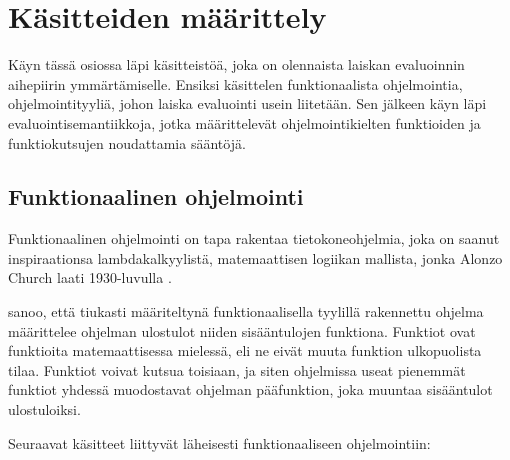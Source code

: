 \section{Käsitteiden määrittely}\label{kasitteisto}

Käyn tässä osiossa läpi käsitteistöä, joka on olennaista laiskan evaluoinnin aihepiirin ymmärtämiselle. Ensiksi käsittelen funktionaalista ohjelmointia, ohjelmointityyliä, johon laiska evaluointi usein liitetään. Sen jälkeen käyn läpi evaluointisemantiikkoja, jotka määrittelevät ohjelmointikielten funktioiden ja funktiokutsujen noudattamia sääntöjä.

\subsection{Funktionaalinen ohjelmointi}
Funktionaalinen ohjelmointi on tapa rakentaa tietokoneohjelmia, joka on saanut inspiraationsa lambdakalkyylistä, matemaattisen logiikan mallista, jonka Alonzo Church laati 1930-luvulla \citep{church1932set}.

\citet{scott2009programming} sanoo, että tiukasti määriteltynä funktionaalisella tyylillä rakennettu ohjelma määrittelee ohjelman ulostulot niiden sisääntulojen funktiona. Funktiot ovat funktioita matemaattisessa mielessä, eli ne eivät muuta funktion ulkopuolista tilaa. Funktiot voivat kutsua toisiaan, ja siten ohjelmissa useat pienemmät funktiot yhdessä muodostavat ohjelman pääfunktion, joka muuntaa sisääntulot ulostuloiksi.

Seuraavat käsitteet liittyvät läheisesti funktionaaliseen ohjelmointiin:

